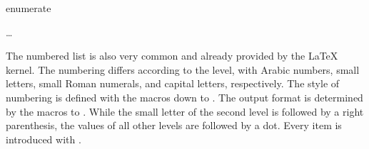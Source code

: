   \begin{Declaration}
    \begin{Environment}{enumerate}
      \begin{Body}
         \dots
        \BodyDots
      \end{Body}
    \end{Environment}
  \end{Declaration}%
  The numbered
  list is also very common and already provided by the
  {\LaTeX} kernel. The numbering differs according to the
  level, with Arabic numbers, small letters, small Roman numerals, and capital
  letters, respectively. The style of numbering is defined with the macros
   down to . The output format is determined
  by the macros  to . While the small
  letter of the second level is followed by a right parenthesis, the values of
  all other levels are followed by a dot. Every item is introduced with
  .%
